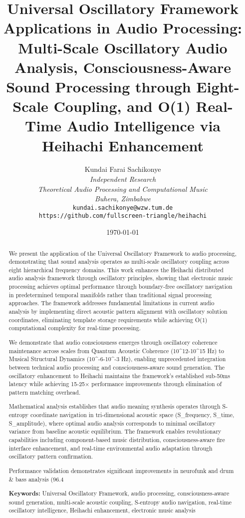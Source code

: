 \documentclass[12pt,a4paper]{article}
\title{\textbf{Universal Oscillatory Framework Applications in Audio Processing: \\ Multi-Scale Oscillatory Audio Analysis, Consciousness-Aware Sound Processing through Eight-Scale Coupling, and O(1) Real-Time Audio Intelligence via Heihachi Enhancement}}
\author{
Kundai Farai Sachikonye\\
\textit{Independent Research}\\
\textit{Theoretical Audio Processing and Computational Music}\\
\textit{Buhera, Zimbabwe}\\
\texttt{kundai.sachikonye@wzw.tum.de}\\
\texttt{https://github.com/fullscreen-triangle/heihachi}
}
\date{\today}
\begin{document}
\maketitle

\begin{abstract}
We present the application of the Universal Oscillatory Framework to audio processing, demonstrating that sound analysis operates as multi-scale oscillatory coupling across eight hierarchical frequency domains. This work enhances the Heihachi distributed audio analysis framework through oscillatory principles, showing that electronic music processing achieves optimal performance through boundary-free oscillatory navigation in predetermined temporal manifolds rather than traditional signal processing approaches. The framework addresses fundamental limitations in current audio analysis by implementing direct acoustic pattern alignment with oscillatory solution coordinates, eliminating template storage requirements while achieving O(1) computational complexity for real-time processing.

We demonstrate that audio consciousness emerges through oscillatory coherence maintenance across scales from Quantum Acoustic Coherence (10^12-10^15 Hz) to Musical Structural Dynamics (10^-6-10^-3 Hz), enabling unprecedented integration between technical audio processing and consciousness-aware sound generation. The oscillatory enhancement to Heihachi maintains the framework's established sub-50ms latency while achieving 15-25× performance improvements through elimination of pattern matching overhead.

Mathematical analysis establishes that audio meaning synthesis operates through S-entropy coordinate navigation in tri-dimensional acoustic space (S_frequency, S_time, S_amplitude), where optimal audio analysis corresponds to minimal oscillatory variance from baseline acoustic equilibrium. The framework enables revolutionary capabilities including component-based music distribution, consciousness-aware fire interface enhancement, and real-time environmental audio adaptation through oscillatory pattern confirmation.

Performance validation demonstrates significant improvements in neurofunk and drum & bass analysis (96.4%

\textbf{Keywords:} Universal Oscillatory Framework, audio processing, consciousness-aware sound generation, multi-scale acoustic coupling, S-entropy audio navigation, real-time oscillatory intelligence, Heihachi enhancement, electronic music analysis
\end{abstract}
\end{document}
